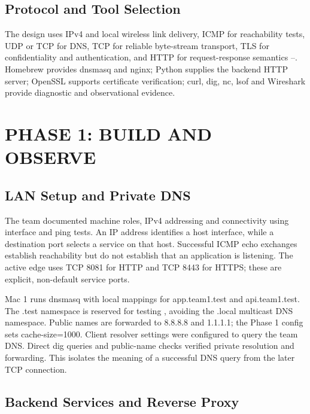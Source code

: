\documentclass[conference]{IEEEtran}
\begin{document}
\subsection{Protocol and Tool
Selection}\label{c.-protocol-and-tool-selection}

The design uses IPv4 and local wireless link delivery, ICMP for
reachability tests, UDP or TCP for DNS, TCP for reliable byte-stream
transport, TLS for confidentiality and authentication, and HTTP for
request-response semantics \cite{ref3}--\cite{ref8}. Homebrew provides dnsmasq
and nginx; Python supplies the backend HTTP server; OpenSSL supports
certificate verification; curl, dig, nc, lsof and Wireshark provide
diagnostic and observational evidence.

\section{PHASE 1: BUILD AND
OBSERVE}\label{iii.-phase-1-build-and-observe}

\subsection{LAN Setup and Private
DNS}\label{a.-lan-setup-and-private-dns}

The team documented machine roles, IPv4 addressing and connectivity
using interface and ping tests. An IP address identifies a host
interface, while a destination port selects a service on that host.
Successful ICMP echo exchanges establish reachability but do not
establish that an application is listening. The active edge uses TCP
8081 for HTTP and TCP 8443 for HTTPS; these are explicit, non-default
service ports.

Mac 1 runs dnsmasq with local mappings for app.team1.test and
api.team1.test. The .test namespace is reserved for testing \cite{ref9},
avoiding the .local multicast DNS namespace. Public names are forwarded
to 8.8.8.8 and 1.1.1.1; the Phase 1 config sets cache-size=1000. Client
resolver settings were configured to query the team DNS. Direct dig
queries and public-name checks verified private resolution and
forwarding. This isolates the meaning of a successful DNS query from the
later TCP connection.

\subsection{Backend Services and Reverse
Proxy}\label{b.-backend-services-and-reverse-proxy}
\end{document}
